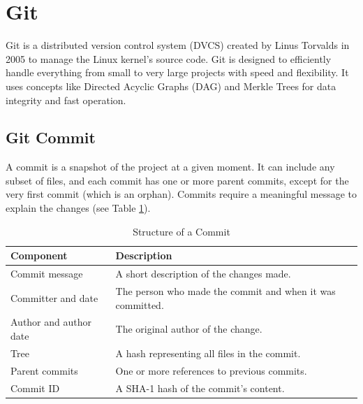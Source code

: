 \section{Git}
Git is a distributed version control system (DVCS) created by Linus Torvalds in 2005 to manage the Linux kernel’s source code. Git is designed to efficiently handle everything from small to very large projects with speed and flexibility. It uses concepts like Directed Acyclic Graphs (DAG) and Merkle Trees for data integrity and fast operation.

\subsection*{Git Commit}
A commit is a snapshot of the project at a given moment. It can include any subset of files, and each commit has one or more parent commits, except for the very first commit (which is an orphan). Commits require a meaningful message to explain the changes (see Table \ref{tab:commit_structure}).

\begin{table}[h]
    \centering
    \begin{tabular}{|l|p{10cm}|}
    \hline
    \textbf{Component}           & \textbf{Description}                                                                \\ \hline
    Commit message               & A short description of the changes made.                                             \\ \hline
    Committer and date           & The person who made the commit and when it was committed.                            \\ \hline
    Author and author date       & The original author of the change.
                 \\ \hline
    Tree                         & A hash representing all files in the commit.                                         \\ \hline
    Parent commits               & One or more references to previous commits.                                          \\ \hline
    Commit ID                    & A SHA-1 hash of the commit's content.                                                \\ \hline
    \end{tabular}
    \caption{Structure of a Commit}
    \label{tab:commit_structure}
\end{table}


